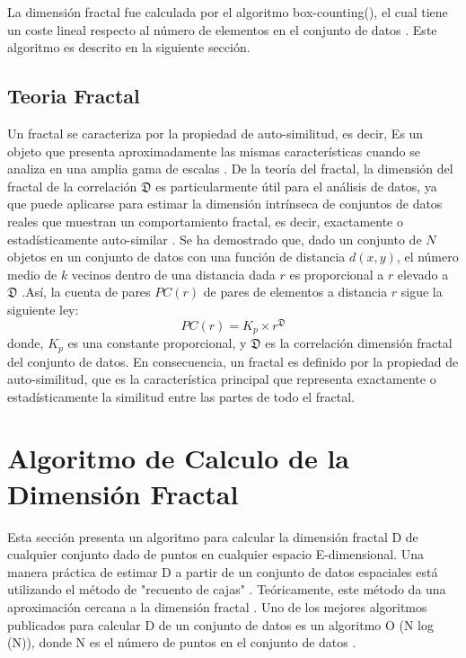 La dimensión fractal fue calculada por el algoritmo box-counting(), el cual tiene un coste lineal respecto al número de elementos en el conjunto de datos  \cite{DBLP:journals/jidm/TrainaTF10}. Este algoritmo es descrito en la siguiente sección. 


 
\subsection{Teoria Fractal}
 
Un fractal se caracteriza por la propiedad de auto-similitud, es decir, Es un objeto que presenta aproximadamente las mismas características cuando se analiza en una amplia gama de escalas \cite{DBLP:journals/jidm/TrainaTWF10,DBLP:fractal2016}. De la teoría del fractal, la dimensión del fractal de la correlación $\mathfrak{D}$ es particularmente útil para el análisis de datos, ya que puede aplicarse para estimar la dimensión intrínseca de conjuntos de datos reales que muestran un comportamiento fractal, es decir, exactamente o estadísticamente auto-similar \cite{Belussi:1995:ESS:645921.673166}. Se ha demostrado que, dado un conjunto de $N$ objetos en un conjunto de datos con una función de distancia $d(x,y)$, el número medio de $k$ vecinos dentro de una distancia dada $r$ es proporcional a $r$ elevado a $\mathfrak{D}$  \cite{Arantes_thefractal}.Así, la cuenta de pares $PC(r)$ de pares de elementos a distancia $r$ sigue la siguiente ley:
\begin{equation}\label{eq:fractal}
	   PC(r) = K_p \times r^{\mathfrak{D}}		
	\end{equation}
donde, $K_p$ es una constante proporcional, y $\mathfrak{D}$ es la correlación dimensión fractal del conjunto de datos.     En consecuencia, un fractal es definido por la propiedad de auto-similitud, que es la característica principal que representa exactamente o estadísticamente la similitud entre las partes de todo el fractal.  
 
 
\section{Algoritmo de Calculo de la Dimensión Fractal}
 
Esta sección presenta un algoritmo para calcular la dimensión fractal D de cualquier conjunto dado de puntos en cualquier espacio E-dimensional. Una manera práctica de estimar D a partir de un conjunto de datos espaciales está utilizando el método de "recuento de cajas"  \cite{schroederpower}. Teóricamente, este método da una aproximación cercana a la dimensión fractal  \cite{DBLP:journals/jidm/TrainaTF10} \cite{traina1999distance}. Uno de los mejores algoritmos publicados para calcular D de un conjunto de datos es un algoritmo O (N log (N)), donde N es el número de puntos en el conjunto de datos \cite{belussi1998estimating}.  



